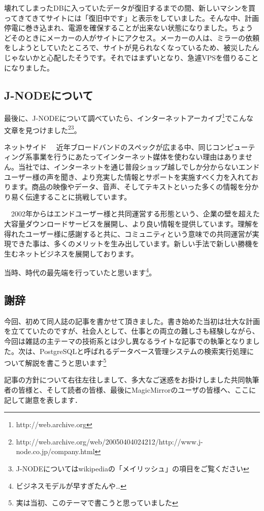 壊れてしまったDBに入っていたデータが復旧するまでの間、新しいマシンを買ってきてきてサイトには「復旧中です」と表示をしていました。そんな中、計画停電に巻き込まれ、電源を確保することが出来ない状態になりました。ちょうどそのときにメーカーの人がサイトにアクセス。メーカーの人は、ミラーの依頼をしようとしていたところで、サイトが見られなくなっているため、被災したんじゃないかと心配したそうです。それではまずいとなり、急遽VPSを借りることになりました。



\subsection{J-NODEについて}

最後に、J-NODEについて調べていたら、インターネットアーカイブ\footnote{http://web.archive.org}でこんな文章を見つけました\footnote{http://web.archive.org/web/20050404024212/http://www.j-node.co.jp/company.html}\footnote{J-NODEについてはwikipediaの「メイリッシュ」の項目をご覧ください}。

\begin{screen}
ネットサイド
　近年ブロードバンドのスペックが広まる中、同じコンピューティング系事業を行うにあたってインターネット媒体を使わない理由はありません。当社では、インターネットを通じ普段ショップ越しでしか分からないエンドユーザー様の声を聞き、より充実した情報とサポートを実施すべく力を入れております。商品の映像やデータ、音声、そしてテキストといった多くの情報を分かり易く伝達することに挑戦しています。

　2002年からはエンドユーザー様と共同運営する形態という、企業の壁を超えた大容量ダウンロードサービスを展開し、より良い情報を提供しています。理解を得れたユーザー様に感謝すると共に、コミュニティという意味での共同運営が実現できた事は、多くのメリットを生み出しています。新しい手法で新しい勝機を生むネットビジネスを展開しております。

\end{screen}

当時、時代の最先端を行っていたと思います\footnote{ビジネスモデルが早すぎたんや…}。

\subsection{謝辞}
今回、初めて同人誌の記事を書かせて頂きました。書き始めた当初は壮大な計画を立てていたのですが、社会人として、仕事との両立の難しさも経験しながら、今回は雑誌の主テーマの技術系とは少し異なるライトな記事での執筆となりました。次は、PostgreSQLと呼ばれるデータベース管理システムの検索実行処理について解説を書こうと思います\footnote{実は当初、このテーマで書こうと思っていました}

記事の方針について右往左往しまして、多大なご迷惑をお掛けしました共同執筆者の皆様と、そして読者の皆様、最後にMagicMirrorのユーザの皆様へ、ここに記して謝意を表します．